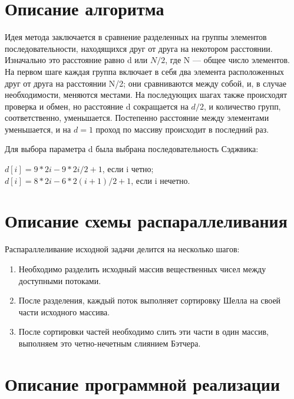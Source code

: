 \documentclass{report}
\begin{document}
\section*{Описание алгоритма}
\par Идея метода заключается в сравнение разделенных на группы элементов последовательности, находящихся друг от друга на некотором расстоянии. Изначально это расстояние равно d или $N/2$, где N — общее число элементов. На первом шаге каждая группа включает в себя два элемента расположенных друг от друга на расстоянии N/2; они сравниваются между собой, и, в случае необходимости, меняются местами. На последующих шагах также происходят проверка и обмен, но расстояние d сокращается на $d/2$, и количество групп, соответственно, уменьшается. Постепенно расстояние между элементами уменьшается, и на $d=1$ проход по массиву происходит в последний раз.

\par Для выбора параметра d была выбрана последовательность Сэджвика:
\begin{center}
$d[i] = 9*2i - 9*2i/2 + 1$, если i четно; \\
$d[i] = 8*2i - 6*2(i+1)/2 + 1$, если i нечетно.
\end{center}

\newpage

\section*{Описание схемы распараллеливания}
Распараллеливание исходной задачи делится на несколько шагов:
\begin{enumerate}
\item Необходимо разделить исходный массив вещественных чисел между доступными потоками. 
\item После разделения, каждый поток выполняет сортировку Шелла на своей части исходного массива.
\item После сортировки частей необходимо слить эти части в один массив, выполняем это четно-нечетным слиянием Бэтчера.
\end{enumerate}
\newpage

\section*{Описание программной реализации}
\end{document}
